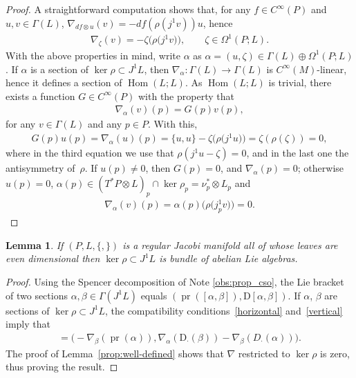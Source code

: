 \documentclass[10pt,a4paper]{amsart}
\numberwithin{equation}{section}
\newtheorem{Lemma}[Theorem]{Lemma}
\newcommand{\pr}{\operatorname{pr}}
\renewcommand{\hom}{\operatorname{Hom}}
\begin{document}
\begin{proof}
A straightforward computation shows that, for any $f \in C^{\infty}(P)$ and $u,v \in \Gamma(L)$, $\nabla_{df\otimes u}(v)=-df(\rho(j^1v))u$, hence
\begin{gather*}\nabla_\zeta(v)=-\zeta\big(\rho\big(j^1v\big)\big), \qquad \zeta\in\Omega^1(P;L).\end{gather*}
With the above properties in mind, write $\alpha$ as $\alpha=(u,\zeta)\in\Gamma(L)\oplus\Omega^1(P;L)$. If $\alpha$ is a section of $\ker\rho\subset J^1L$, then $\nabla_\alpha\colon \Gamma(L)\to\Gamma(L)$ is $C^{\infty}(M)$-linear, hence it def\/ines a section of $\hom(L;L)$. As $\hom(L;L)$ is trivial, there exists a function $G\in C^\infty(P)$ with the property that
\begin{gather*}\nabla_\alpha(v)(p)=G(p)v(p),\end{gather*}
for any $v\in\Gamma(L)$ and any $p\in P$. With this,
\begin{gather*}G(p)u(p)=\nabla_\alpha(u)(p)=\{u,u\}-\zeta\big(\rho\big(j^1u\big)\big)=\zeta(\rho(\zeta))=0,\end{gather*}
where in the third equation we use that $\rho(j^1u-\zeta)=0$, and in the last one the antisymmetry of~$\rho$. If $u(p)\neq 0$, then $G(p)=0$, and $\nabla_\alpha(p)=0$; otherwise $u(p)=0$, $\alpha(p)\in (T^*P\otimes L)_p\cap\ker\rho_p=\nu^*_p\otimes L_p$ and
\begin{gather*}\nabla_\alpha(v)(p)=\alpha(p)\big(\rho\big(j^1_pv\big)\big)=0.\tag*{\qed}\end{gather*}\renewcommand{\qed}{}
\end{proof}

\begin{Lemma}\label{lemma:abelian}
If $(P,L,\{,\})$ is a regular Jacobi manifold all of whose leaves are even dimensional then $\ker\rho\subset J^1L$ is bundle of abelian Lie algebras.
\end{Lemma}

\begin{proof} Using the Spencer decomposition of Note \ref{obs:prop_cso}, the Lie bracket of two sections $\alpha,\beta\in\Gamma(J^1L)$ equals $(\pr([\alpha,\beta]),\mathrm{D}[\alpha,\beta])$. If $\alpha$, $\beta$ are sections of $\ker\rho\subset J^1L$, the compatibility conditions~\eqref{horizontal} and~\eqref{vertical} imply that
 \begin{gather*}
 [\alpha,\beta]=\big({-}\nabla_\beta(\pr(\alpha)), \nabla_\alpha (\mathrm{D}_\cdot(\beta))-\nabla_\beta(D_{\cdot}(\alpha))\big).
 \end{gather*}
The proof of Lemma~\ref{prop:well-defined} shows that $\nabla$ restricted to $\ker\rho$ is zero, thus proving the result.
\end{proof}
\end{document}
